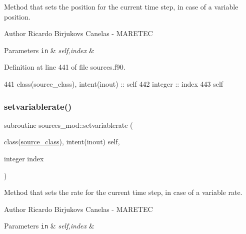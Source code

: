 Method that sets the position for the current time step, in case of a variable position. 

\begin{DoxyAuthor}{Author}
Ricardo Birjukovs Canelas -\/ M\+A\+R\+E\+T\+EC 
\end{DoxyAuthor}

\begin{DoxyParams}[1]{Parameters}
\mbox{\tt in}  & {\em self,index} & \\
\hline
\end{DoxyParams}


Definition at line 441 of file sources.\+f90.


\begin{DoxyCode}
441     \textcolor{keywordtype}{class}(source\_class), \textcolor{keywordtype}{intent(inout)} :: self
442     \textcolor{keywordtype}{integer} :: index
443     self%
\end{DoxyCode}
\mbox{\label{namespacesources__mod_a2777c01e39726d0acdafa7dabd8c1a6d}} 
\subsubsection{\texorpdfstring{setvariablerate()}{setvariablerate()}}
{\footnotesize\ttfamily subroutine sources\+\_\+mod\+::setvariablerate (\begin{DoxyParamCaption}\item[{class(\mbox{\hyperlink{structsources__mod_1_1source__class}{source\+\_\+class}}), intent(inout)}]{self,  }\item[{integer}]{index }\end{DoxyParamCaption})\hspace{0.3cm}{\ttfamily [private]}}



Method that sets the rate for the current time step, in case of a variable rate. 

\begin{DoxyAuthor}{Author}
Ricardo Birjukovs Canelas -\/ M\+A\+R\+E\+T\+EC 
\end{DoxyAuthor}

\begin{DoxyParams}[1]{Parameters}
\mbox{\tt in}  & {\em self,index} & \\
\hline
\end{DoxyParams}


